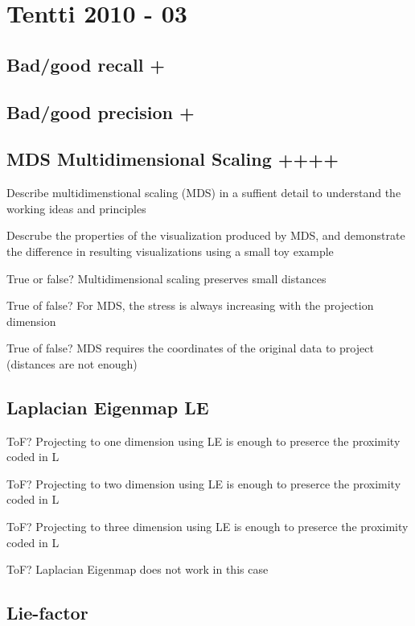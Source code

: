 \documentclass[a4paper]{article}
\begin{document}
\section{Tentti 2010 - 03}

\subsection{Bad/good recall +}

\subsection{Bad/good precision +}

\subsection{MDS Multidimensional Scaling ++++}

Describe multidimenstional scaling (MDS) in a suffient detail to understand the working ideas and principles

Descrube the properties of the visualization produced by MDS, and demonstrate the difference in resulting visualizations using a small toy example

True or false? Multidimensional scaling preserves small distances

True of false? For MDS, the stress is always increasing with the projection dimension

True of false? MDS requires the coordinates of the original data to project (distances are not enough)

\subsection{Laplacian Eigenmap LE}

ToF? Projecting to one dimension using LE is enough to preserce the proximity coded in L

ToF? Projecting to two dimension using LE is enough to preserce the proximity coded in L

ToF? Projecting to three dimension using LE is enough to preserce the proximity coded in L

ToF? Laplacian Eigenmap does not work in this case

\subsection{Lie-factor}
\end{document}
